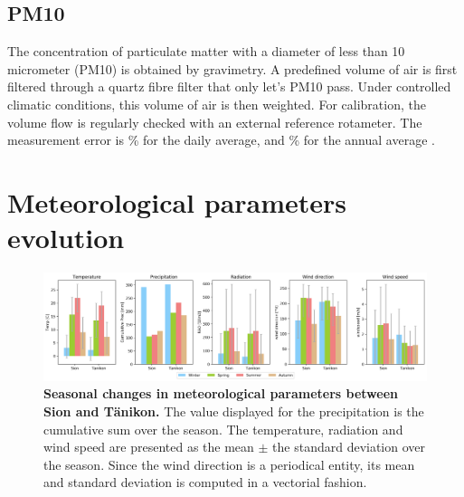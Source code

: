 \documentclass[a4paper, 12pt]{article}
\begin{document}
    \subsection{PM10}
        The concentration of particulate matter with a diameter of less than 10 micrometer (PM10) is obtained by gravimetry. A predefined volume of air is first filtered through a quartz fibre filter that only let’s PM10 pass. Under controlled climatic conditions, this volume of air is then weighted. For calibration, the volume flow is regularly checked with an external reference rotameter. The measurement error is \% for the daily average, and \% for the annual average \cite{NABEL}.
    

\section{Meteorological parameters evolution} \label{seasonal_section}
    
    \begin{figure}[t]
        \centering
        \includegraphics[width = 1 \textwidth]{Figures/season2_avg.png}
        \caption{\textbf{Seasonal changes in meteorological parameters between Sion and Tänikon.} The value displayed for the precipitation is the cumulative sum over the season. The temperature, radiation and wind speed are presented as the mean $\pm$ the standard deviation over the season. Since the wind direction is a periodical entity, its mean and standard deviation is computed in a vectorial fashion.}
        \label{meteo_season}
    \end{figure}
    
\end{document}
